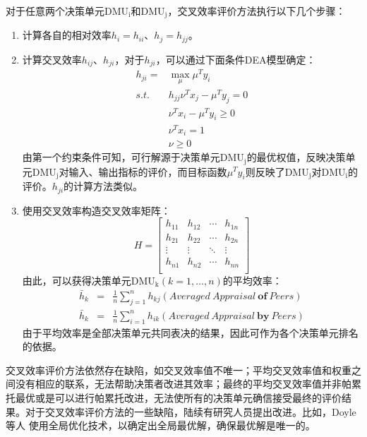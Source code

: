 对于任意两个决策单元$\mathrm{DMU_i}$和$\mathrm{DMU_j}$，交叉效率评价方法执行以下几个步骤：
\begin{enumerate}[（1）]
  \item 计算各自的相对效率$h_i = h_{ii}$、$h_j = h_{jj}$。
  \item 计算交叉效率$h_{ij}$、$h_{ji}$，对于$h_{ji}$，可以通过下面条件DEA模型确定：
\begin{equation}\label{eq:ce1}
\begin{array}{ll}
  h_{ji} = & \max\limits_{\mu} \mu^T y_i\\
  \textit{s.t.} & h_{jj}\nu^Tx_j - \mu^Ty_j = 0 \\
   & \nu^Tx_i - \mu^Ty_i \ge 0 \\
   & \nu^Tx_i = 1 \\
   & \nu\ge 0
\end{array}
\end{equation}
由第一个约束条件可知，可行解源于决策单元$\mathrm{DMU_j}$的最优权值，反映决策单元$\mathrm{DMU_j}$对输入、输出指标的评价，而目标函数$\mu^T y_i$则反映了$\mathrm{DMU_j}$对$\mathrm{DMU_i}$的评价。$h_{ji}$的计算方法类似。
  \item 使用交叉效率构造交叉效率矩阵：
\begin{equation}
H=
\begin{bmatrix}
h_{11} & h_{12} & \cdots & h_{1n}\\
h_{21} & h_{22} & \cdots & h_{2n}\\
\vdots & \vdots & \ddots & \vdots\\
h_{n1} & h_{n2} & \cdots & h_{nn}\\
\end{bmatrix}
\end{equation}\label{eq:cem}
由此，可以获得决策单元$\mathrm{DMU_k}(k = 1,\ldots,n)$的平均效率\cite{doyle1994efficiency}：
\begin{equation}\label{eq:averageefficiency}
  \begin{array}{lll}
    \bar{h}_k  & = & \frac{1}{n}\sum\limits_{j=1}^nh_{kj} (Averaged~Appraisal~\textbf{of}~Peers)\\
    \bar{h}_k & = & \frac{1}{n}\sum\limits_{i=1}^n h_{ik} (Averaged~Appraisal~\textbf{by}~Peers)
  \end{array}
\end{equation}
由于平均效率是全部决策单元共同表决的结果，因此可作为各个决策单元排名的依据。
\end{enumerate}

交叉效率评价方法依然存在缺陷，如交叉效率值不唯一；平均交叉效率值和权重之间没有相应的联系，无法帮助决策者改进其效率；最终的平均交叉效率值并非帕累托最优或是可以进行帕累托改进，无法使所有的决策单元确信接受最终的评价结果。对于交叉效率评价方法的一些缺陷，陆续有研究人员提出改进。比如，Doyle 等人
\cite{doyle1994efficiency}使用全局优化技术，以确定出全局最优解，确保最优解是唯一的。

